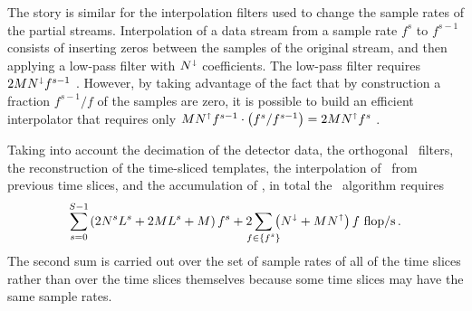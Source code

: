 The story is similar for the interpolation filters used to change the sample rates of the partial \SNR{} streams.  Interpolation of a data stream from a sample rate $f^s$ to $f^{s-1}$ consists of inserting zeros between the samples of the original stream, and then applying a low-pass filter with $N^\shortdownarrow$ coefficients.  The low-pass filter requires $2 M N^\shortdownarrow f^{s-1}$ \flops.  However, by taking advantage of the fact that by construction a fraction $f^{s-1}/f$ of the samples are zero, it is possible to build an efficient interpolator that requires only $M N^\shortuparrow f^{s-1} \cdot \left( f^s / f^{s-1} \right) = 2 M N^\shortuparrow f^s$ \flops.

Taking into account the decimation of the detector data, the orthogonal \fir\ filters, the reconstruction of the time-sliced templates, the interpolation of \SNR\ from previous time slices, and the accumulation of \SNR, in total the \lloid\ algorithm requires
$$
\sum_{\mathclap{s=0}}^{\mathclap{S-1}} \left( 2 \slicessamps \numsvdtmps + 2 \numtmps \numsvdtmps + \numtmps \right) f^s + 2\sum_{\mathclap{f \in \{f^s\}}} \left( N^\shortdownarrow + \numtmps N^\shortuparrow \right) f \textrm{ \flops}\,.
$$
The second sum is carried out over the set of sample rates of all of the time slices rather than over the time slices themselves because some time slices may have the same sample rates.

